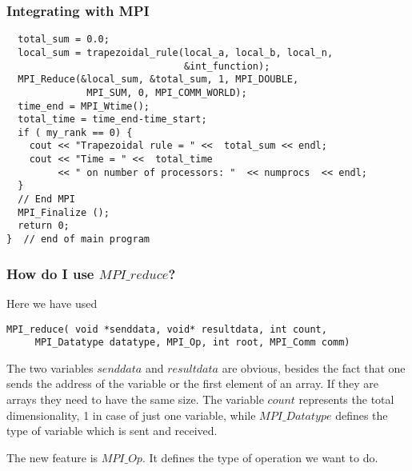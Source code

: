 \documentclass{beamer}
\begin{document}
\begin{frame}
\frametitle{Integrating with \textbf{MPI}}

\begin{block}{}

\begin{verbatim}
  total_sum = 0.0;
  local_sum = trapezoidal_rule(local_a, local_b, local_n, 
                               &int_function); 
  MPI_Reduce(&local_sum, &total_sum, 1, MPI_DOUBLE, 
              MPI_SUM, 0, MPI_COMM_WORLD);
  time_end = MPI_Wtime();
  total_time = time_end-time_start;
  if ( my_rank == 0) {
    cout << "Trapezoidal rule = " <<  total_sum << endl;
    cout << "Time = " <<  total_time  
         << " on number of processors: "  << numprocs  << endl;
  }
  // End MPI
  MPI_Finalize ();  
  return 0;
}  // end of main program
\end{verbatim}

\end{block}
\end{frame}

\begin{frame}
\frametitle{How do I use $MPI\_reduce$?}

\begin{block}{}

Here we have used
\begin{verbatim}
MPI_reduce( void *senddata, void* resultdata, int count, 
     MPI_Datatype datatype, MPI_Op, int root, MPI_Comm comm)
\end{verbatim}

The two variables $senddata$ and $resultdata$ are obvious, besides the fact that one sends the address
of the variable or the first element of an array.  If they are arrays they need to have the same size. 
The variable $count$ represents the total dimensionality, 1 in case of just one variable, 
while $MPI\_Datatype$ 
defines the type of variable which is sent and received.  

The new feature is $MPI\_Op$. It defines the type
of operation we want to do. 
\end{block}
\end{frame}
\end{document}
